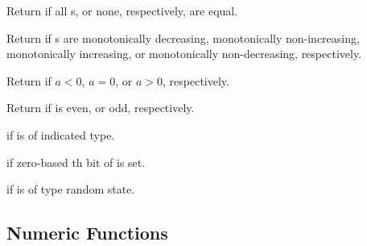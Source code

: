 \begin{LIST}{1cm}

     {
       \index{=}%
       \index{/=}%
       Return \retval{\T} if all s, or
       none, respectively,  are equal.
     }

  {
  Return \retval{\T} if s are
  monotonically decreasing, monotonically non-increasing,
  monotonically increasing, or monotonically non-decreasing, respectively. 
  }

  {
  Return \retval{\T} if $a < 0$, $a = 0$, or $a > 0$, respectively.
  }

  {
    Return \retval{\T} if  is even, or odd, respectively.
  }

  {
  \retval{\T} if  is of
  indicated type.
  }

  {
  \retval{\T} if zero-based th bit of  is set.
  }

  {
  \retval{\T} if  is of type random state.
  }

\end{LIST}

\subsection{Numeric Functions} 


